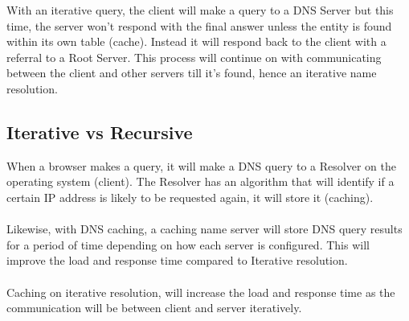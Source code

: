 With an iterative query, the client will make a query to a DNS Server but this time, the server won’t respond with the final answer unless the entity is found within its own table (cache). Instead it will respond back to the client with a referral to a Root Server. This process will continue on with communicating between the client and other servers till it’s found, hence an iterative name resolution.

\subsection{Iterative vs Recursive}

When a browser makes a query, it will make a DNS query to a Resolver on the operating system (client). The Resolver has an algorithm that will identify if a certain IP address is likely to be requested again, it will store it (caching). \\\\Likewise, with DNS caching, a caching name server will store DNS query results for a period of time depending on how each server is configured. This will improve the load and response time compared to Iterative resolution. \\\\Caching on iterative resolution, will increase the load and response time as the communication will be between client and server iteratively.




